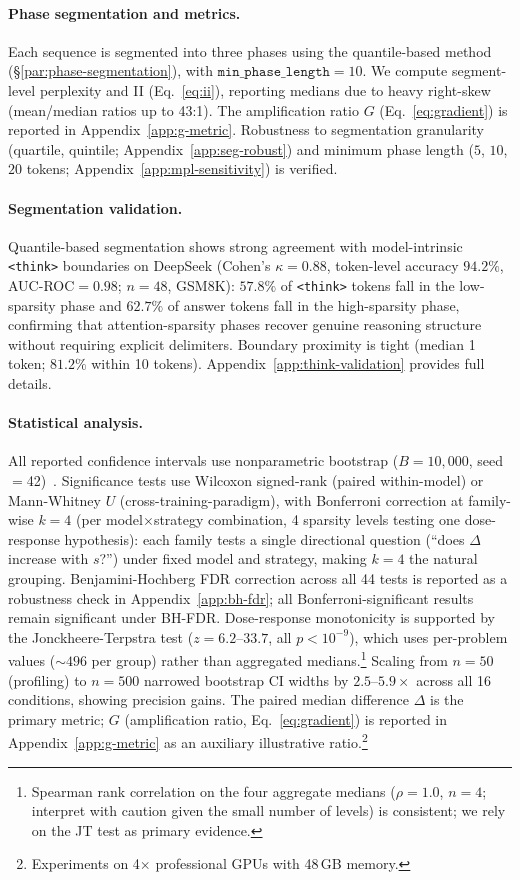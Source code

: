 \paragraph{Phase segmentation and metrics.}
Each sequence is segmented into three phases using the quantile-based method (\S\ref{par:phase-segmentation}), with $\texttt{min\_phase\_length}{=}10$. We compute segment-level perplexity and II (Eq.~\ref{eq:ii}), reporting medians due to heavy right-skew (mean/median ratios up to 43:1). The amplification ratio $G$ (Eq.~\ref{eq:gradient}) is reported in Appendix~\ref{app:g-metric}. Robustness to segmentation granularity (quartile, quintile; Appendix~\ref{app:seg-robust}) and minimum phase length ($5$, $10$, $20$ tokens; Appendix~\ref{app:mpl-sensitivity}) is verified.

\paragraph{Segmentation validation.}
Quantile-based segmentation shows strong agreement with model-intrinsic \texttt{<think>} boundaries on DeepSeek (Cohen's $\kappa{=}0.88$, token-level accuracy $94.2\%$, AUC-ROC${=}0.98$; $n{=}48$, GSM8K): $57.8\%$ of \texttt{<think>} tokens fall in the low-sparsity phase and $62.7\%$ of answer tokens fall in the high-sparsity phase, confirming that attention-sparsity phases recover genuine reasoning structure without requiring explicit delimiters. Boundary proximity is tight (median 1 token; $81.2\%$ within 10 tokens). Appendix~\ref{app:think-validation} provides full details.

\paragraph{Statistical analysis.}
\label{par:stats}
All reported confidence intervals use nonparametric bootstrap ($B{=}10{,}000$, seed$=$42)~\cite{efron-1993}. Significance tests use Wilcoxon signed-rank (paired within-model) or Mann-Whitney $U$ (cross-training-paradigm), with Bonferroni correction at family-wise $k{=}4$ (per model$\times$strategy combination, 4 sparsity levels testing one dose-response hypothesis): each family tests a single directional question (``does $\Delta$ increase with $s$?'') under fixed model and strategy, making $k{=}4$ the natural grouping. Benjamini-Hochberg FDR correction across all 44 tests is reported as a robustness check in Appendix~\ref{app:bh-fdr}; all Bonferroni-significant results remain significant under BH-FDR. Dose-response monotonicity is supported by the Jonckheere-Terpstra test ($z{=}6.2$--$33.7$, all $p < 10^{-9}$), which uses per-problem values (${\sim}496$ per group) rather than aggregated medians.\footnote{Spearman rank correlation on the four aggregate medians ($\rho{=}1.0$, $n{=}4$; interpret with caution given the small number of levels) is consistent; we rely on the JT test as primary evidence.} Scaling from $n{=}50$ (profiling) to $n{=}500$ narrowed bootstrap CI widths by $2.5$--$5.9{\times}$ across all 16 conditions, showing precision gains. The paired median difference $\Delta$ is the primary metric; $G$ (amplification ratio, Eq.~\ref{eq:gradient}) is reported in Appendix~\ref{app:g-metric} as an auxiliary illustrative ratio.\footnote{Experiments on 4$\times$ professional GPUs with 48\,GB memory.}
